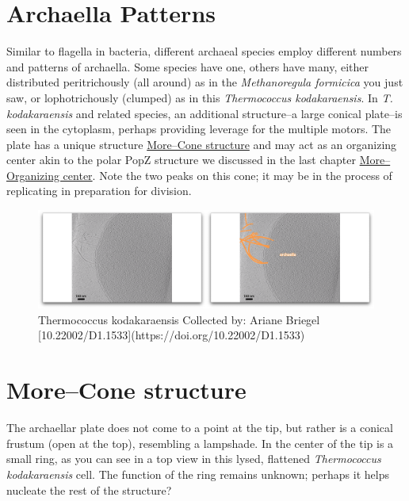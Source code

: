 \documentclass[]{tufte-book}
\begin{document}
\section{Archaella Patterns}\label{archaella-patterns}

Similar to flagella in bacteria, different archaeal species employ
different numbers and patterns of archaella. Some species have one,
others have many, either distributed peritrichously (all around) as in
the \emph{Methanoregula formicica} you just saw, or lophotrichously
(clumped) as in this \emph{Thermococcus kodakaraensis}. In \emph{T.
kodakaraensis} and related species, an additional structure--a large
conical plate--is seen in the cytoplasm, perhaps providing leverage for
the multiple motors. The plate has a unique structure
\protect\hyperlink{morecone-structure}{More--Cone structure} and may act
as an organizing center akin to the polar PopZ structure we discussed in
the last chapter
\protect\hyperlink{moreorganizing-center}{More--Organizing center}. Note
the two peaks on this cone; it may be in the process of replicating in
preparation for division.

\begin{figure}
\includegraphics{movie_stills/6_9} \caption[Thermococcus kodakaraensis Collected by]{Thermococcus kodakaraensis Collected by: Ariane Briegel [10.22002/D1.1533](https://doi.org/10.22002/D1.1533)}\label{fig:unnamed-chunk-115}
\end{figure}

\hypertarget{morecone-structure}{\section{More--Cone
structure}\label{morecone-structure}}

The archaellar plate does not come to a point at the tip, but rather is
a conical frustum (open at the top), resembling a lampshade. In the
center of the tip is a small ring, as you can see in a top view in this
lysed, flattened \emph{Thermococcus kodakaraensis} cell. The function of
the ring remains unknown; perhaps it helps nucleate the rest of the
structure?
\end{document}
